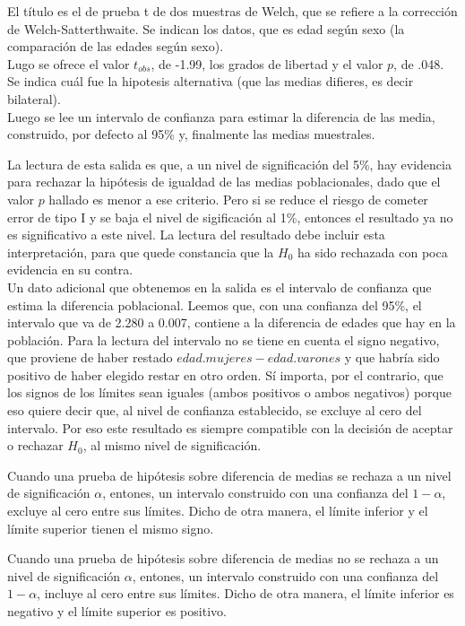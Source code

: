\documentclass[]{book}
\begin{document}
El título es el de prueba t de dos muestras de Welch, que se refiere a la corrección de Welch-Satterthwaite. Se indican los datos, que es edad según sexo (la comparación de las edades según sexo).\\
Lugo se ofrece el valor \(t_{obs}\), de -1.99, los grados de libertad y el valor \(p\), de .048. Se indica cuál fue la hipotesis alternativa (que las medias difieres, es decir bilateral).\\
Luego se lee un intervalo de confianza para estimar la diferencia de las media, construido, por defecto al 95\% y, finalmente las medias muestrales.

La lectura de esta salida es que, a un nivel de significación del 5\%, hay evidencia para rechazar la hipótesis de igualdad de las medias poblacionales, dado que el valor \(p\) hallado es menor a ese criterio. Pero si se reduce el riesgo de cometer error de tipo I y se baja el nivel de sigificación al 1\%, entonces el resultado ya no es significativo a este nivel. La lectura del resultado debe incluir esta interpretación, para que quede constancia que la \(H_{0}\) ha sido rechazada con poca evidencia en su contra.\\
Un dato adicional que obtenemos en la salida es el intervalo de confianza que estima la diferencia poblacional. Leemos que, con una confianza del 95\%, el intervalo que va de 2.280 a 0.007, contiene a la diferencia de edades que hay en la población. Para la lectura del intervalo no se tiene en cuenta el signo negativo, que proviene de haber restado \(edad.mujeres - edad.varones\) y que habría sido positivo de haber elegido restar en otro orden. Sí importa, por el contrario, que los signos de los límites sean iguales (ambos positivos o ambos negativos) porque eso quiere decir que, al nivel de confianza establecido, se excluye al cero del intervalo. Por eso este resultado es siempre compatible con la decisión de aceptar o rechazar \(H_{0}\), al mismo nivel de significación.

Cuando una prueba de hipótesis sobre diferencia de medias se rechaza a un nivel de significación \(\alpha\), entones, un intervalo construido con una confianza del \(1-\alpha\), excluye al cero entre sus límites. Dicho de otra manera, el límite inferior y el límite superior tienen el mismo signo.

Cuando una prueba de hipótesis sobre diferencia de medias no se rechaza a un nivel de significación \(\alpha\), entones, un intervalo construido con una confianza del \(1-\alpha\), incluye al cero entre sus límites. Dicho de otra manera, el límite inferior es negativo y el límite superior es positivo.
\end{document}
